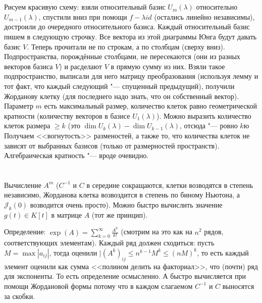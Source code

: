 \section{} %
Рисуем красивую схему: взяли относительный базис $U_m(\lambda)$ относительно $U_{m-1}(\lambda)$, спустили вниз при помощи $f-\lambda id$ (остались линейно независимы), достроили до очередного относительного базиса.
Каждый относительный базис пишем в следующую строчку.
Все вектора из этой диаграммы Юнга будут давать базис $V$.
Теперь прочитали не по строкам, а по столбцам (сверху вниз).
Подпространства, порождённые столбцами, не пересекаются (они из разных векторов базиса $V$) и расделают $V$ в прямую сумму из них.
Взяли такое подпространство, выписали для него матрицу преобразования (используя лемму и тот факт, что каждый следующий "--- спущенный предыдущий), получили Жорданову клетку (для последнего надо знать, что он собственный вектор).
Параметр $m$ есть максимальный размер, количество клеток равно геометрической кратности (количеству векторов в базисе $U_1(\lambda)$).
Можно выразить количество клеток размера $\ge k$ (это $\dim U_k(\lambda) - \dim U_{k-1} (\lambda)$, отсюда "--- ровно $k$ю
Получаем <<вогнутость>> разменостей, а также то, что количества клеток не зависят от выбранных базисов (только от размерностей пространств).
Алгебраическая кратность "--- вроде очевидно.

\section{} %
Вычисление $A^m$ ($C^{-1}$ и $C$ в середине сокращаются, клетки возводятся в степень независимо, Жорданова клетка возвоздится в степень по биному Ньютона, а $\mathcal{J}_k(0)$ возводится очень просто).
Можно быстро вычислить значение $g(t) \in K[t]$ в матрице $A$ (тот же принцип).

Определение:
$\exp(A) = \sum_{k=0}^\infty \frac{A^k}{k!}$ (смотрим на это как на $n^2$ рядов, соответствующих элементам).
Каждый ряд должен сходиться: пусть $M=\max |a_{ij}|$, тогда оценили $|(A^k)_{ij} \le n^{k-1}M^k \le (nM) ^ k$, то есть каждый элемент оценили как сумма <<полином делить на факториал>>, что (почти) ряд для экспоненты.
То есть определение осмысленно.
А быстро вычисляется при помощи Жордановой формы потому что в каждом слагаемом $C^{-1}$ и $C$ выносятся за скобки.
